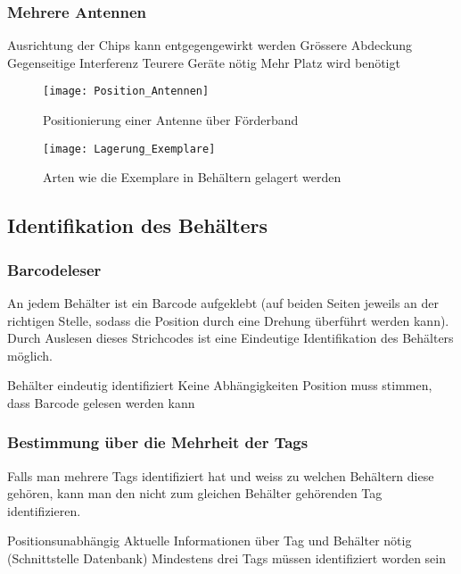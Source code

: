 \subsubsection{Mehrere Antennen}
\begin{itemize}
	\pro Ausrichtung der Chips kann entgegengewirkt werden
	\pro Grössere Abdeckung
	\con Gegenseitige Interferenz
	\con Teurere Geräte nötig
	\con Mehr Platz wird benötigt
\end{itemize}

\begin{figure}
	\centering
	\texttt{[image: Position\_Antennen]}
	\caption{Positionierung einer Antenne über Förderband}
	\label{fig:PosAntennen}
\end{figure}

\begin{figure}
	\centering
	\texttt{[image: Lagerung\_Exemplare]}
	\caption{Arten wie die Exemplare in Behältern gelagert werden}
	\label{fig:LagExemplare}
\end{figure}

\subsection{Identifikation des Behälters}

\subsubsection{Barcodeleser}
An jedem Behälter ist ein Barcode aufgeklebt (auf beiden Seiten jeweils an der richtigen Stelle, sodass die Position durch eine Drehung überführt werden kann). Durch Auslesen dieses Strichcodes ist eine Eindeutige Identifikation des Behälters möglich.
\begin{itemize}
	\pro Behälter eindeutig identifiziert
	\pro Keine Abhängigkeiten
	\con Position muss stimmen, dass Barcode gelesen werden kann
\end{itemize}

\subsubsection{Bestimmung über die Mehrheit der Tags}
Falls man mehrere Tags identifiziert hat und weiss zu welchen Behältern diese gehören, kann man den nicht zum gleichen Behälter gehörenden Tag identifizieren.
\begin{itemize}
	\pro Positionsunabhängig
	\con Aktuelle Informationen über Tag und Behälter nötig (Schnittstelle Datenbank)
	\con Mindestens drei Tags müssen identifiziert worden sein
\end{itemize}

